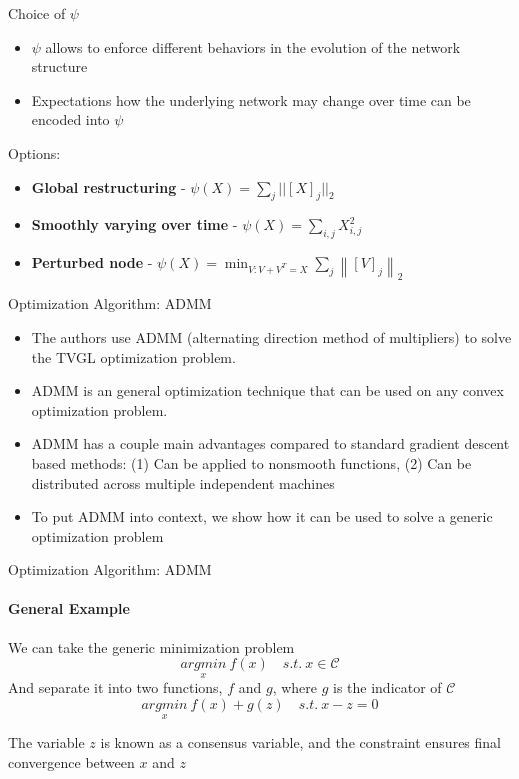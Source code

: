\documentclass{beamer}
\begin{document}
\begin{frame}{Choice of $\psi$}
    \begin{itemize}
        \item $\psi$ allows to enforce different behaviors in the evolution of the network structure
        \item Expectations how the underlying network may change over time can be encoded into $\psi$
    \end{itemize}
    Options:
    \begin{itemize}
        \item \textbf{Global restructuring} - $\psi(X) = \sum_j||[X]_j||_2$
        \item \textbf{Smoothly varying over time} - $\psi(X) = \sum_{i,j}X^2_{i,j}$
        \item \textbf{Perturbed node} - $\psi(X)=\min _{V: V+V^{T}=X} \sum_{j}\left\|[V]_{j}\right\|_{2}$
    \end{itemize}
\end{frame}

\begin{frame}{Optimization Algorithm: ADMM}
	\begin{itemize}
		\item The authors use ADMM (alternating direction method of multipliers) to solve the TVGL optimization problem.
		\item ADMM is an general optimization technique that can be used on any convex optimization problem. 
		\item ADMM has a couple main advantages compared to standard gradient descent based methods: (1) Can be applied to nonsmooth functions, (2) Can be distributed across multiple independent machines
		\item To put ADMM into context, we show how it can be used to solve a generic optimization problem
	\end{itemize}
\end{frame}

\begin{frame}{Optimization Algorithm: ADMM}
\framesubtitle{General Example}
We can take the generic minimization problem
\[\underset{x}{argmin} \ f(x) \quad s.t. \ x \in \mathcal{C}\]
And separate it into two functions, $f$ and $g$, where $g$ is the indicator of $\mathcal{C}$
\[\underset{x}{argmin} \ f(x) + g(z) \quad s.t. \ x - z = 0\]
\begin{center} The variable $z$ is known as a consensus variable, and the constraint ensures final convergence between $x$ and $z$ \end{center}
\end{frame}
\end{document}
